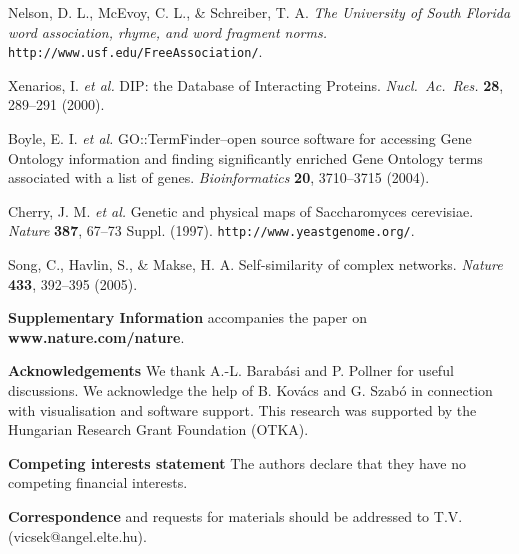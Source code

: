 \documentclass[11pt,a4paper]{article}
\begin{document}
\begin{thebibliography}{99}
Nelson, D. L., McEvoy, C. L., \& Schreiber, T. A.
%
\textit{The University of South Florida word association,
rhyme, and word fragment norms.}
\texttt{http://www.usf.edu/FreeAssociation/}.

Xenarios, I. \textit{et al.}
DIP: the Database of Interacting Proteins.
\textit{Nucl.\ Ac.\ Res.} \textbf{28}, 289--291 (2000).

Boyle, E. I. \textit{et al.}
GO::TermFinder--open source software for accessing Gene Ontology
information and finding significantly enriched Gene Ontology terms
associated with a list of genes.
\textit{Bioinformatics} \textbf{20}, 3710--3715 (2004).

Cherry, J. M. \textit{et al.}
Genetic and physical maps of Saccharomyces cerevisiae.
\textit{Nature} \textbf{387}, 67--73 Suppl. (1997).
\texttt{http://www.yeastgenome.org/}.

Song, C., Havlin, S., \& Makse, H. A.
Self-similarity of complex networks.
\textit{Nature} \textbf{433}, 392--395 (2005).


\end{thebibliography}

\bigskip
\textbf{Supplementary Information} accompanies the paper on
\textbf{www.nature.com/nature}.

\bigskip
\textbf{Acknowledgements}
 We thank A.-L. Barab\'asi and P. Pollner for
 useful discussions. We acknowledge the help of B. Kov\'acs and
 G. Szab\'o in connection with visualisation and software support.
 This research was supported by the Hungarian Research Grant
 Foundation (OTKA).

\bigskip
\textbf{Competing interests statement}
 The authors declare that they have no competing financial interests.

\bigskip
\textbf{Correspondence} and requests for materials
 should be addressed to T.V. (vicsek@angel.elte.hu).
\end{document}
